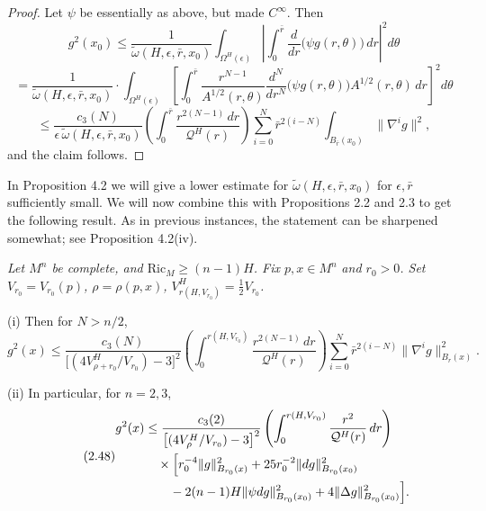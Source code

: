 \begin{proof}
Let $\psi$ be essentially as above, but made $C^\infty$. Then
\begin{equation}
g^2(x_0)\le \frac{1}{\widetilde{\omega}(H,\epsilon,\bar r,x_0)}
\int_{\Omega^H(\epsilon)}\left|\int_0^{\bar r}\frac{d}{dr}\bigl(\psi g(r,\theta)\bigr)\,dr\right|^2 d\theta
\end{equation}
\begin{equation}\tag{2.46}
= \frac{1}{\widetilde{\omega}(H,\epsilon,\bar r,x_0)}
\cdot \int_{\Omega^H(\epsilon)}\left[\int_0^{\bar r}\frac{r^{N-1}}{A^{1/2}(r,\theta)}\frac{d^N}{dr^N}\bigl(\psi g(r,\theta)\bigr)A^{1/2}(r,\theta)\,dr\right]^2 d\theta
\end{equation}
\[
\le \frac{c_3(N)}{\epsilon\,\widetilde{\omega}(H,\epsilon,\bar r,x_0)}
\left(\int_0^{\bar r}\frac{r^{2(N-1)}\,dr}{\mathcal{Q}^H(r)}\right)
\sum_{i=0}^N \bar r^{2(i-N)}\int_{B_{\bar r}(x_0)}\|\nabla^i g\|^2,
\]
and the claim follows.
\end{proof}

In Proposition 4.2 we will give a lower estimate for $\widetilde{\omega}(H,\epsilon,\bar r,x_0)$ for $\epsilon,\bar r$
sufficiently small. We will now combine this with Propositions 2.2 and 2.3 to
get the following result. As in previous instances, the statement can be
sharpened somewhat; see Proposition 4.2(iv).

\begin{theorem}
\label{thm:ricci-lower-bound-pointwise-estimate}
\textit{Let $M^n$ be complete, and $\mathrm{Ric}_M\ge (n-1)H$. Fix $p, x\in M^n$}
\textit{and $r_0>0$. Set $V_{r_0}=V_{r_0}(p)$, $\rho=\rho(p,x)$, $V^H_{r(H,V_{r_0})}=\frac12 V_{r_0}$.}

\noindent (i) Then for $N>n/2$,
\begin{equation}\tag{2.47}
g^2(x)\le \frac{c_3(N)}{\bigl[(4V^H_{\rho+r_0}/V_{r_0})-3\bigr]^2}
\left(\int_0^{r(H,V_{r_0})}\frac{r^{2(N-1)}\,dr}{\mathcal{Q}^H(r)}\right)
\sum_{i=0}^N \bar r^{2(i-N)}\|\nabla^i g\|^2_{B_r(x)}.
\end{equation}

\noindent (ii) In particular, for $n=2,3$,
\begin{equation}\tag{2.48}
\begin{aligned}
g^2(x)&\le \frac{c_3(2)}{\bigl[(4V^H_{\rho}/V_{r_0})-3\bigr]^2}
\left(\int_0^{r(H,V_{r_0})}\frac{r^2}{\mathcal{Q}^H(r)}\,dr\right) \\
&\quad\times\Bigl[r_0^{-4}\|g\|^2_{B_{r_0}(x)}
+25r_0^{-2}\|dg\|^2_{B_{r_0}(x_0)} \\
&\qquad -2(n-1)H\|\psi dg\|^2_{B_{r_0}(x_0)}
+4\|\Delta g\|^2_{B_{r_0}(x_0)}\Bigr].
\end{aligned}
\end{equation}
\end{theorem}

